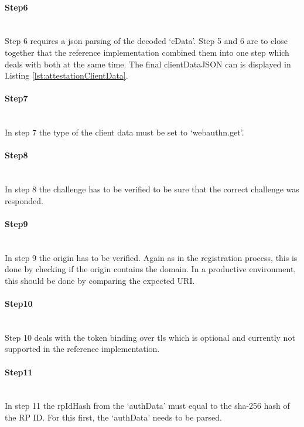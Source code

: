 \documentclass[a4paper, 11pt]{scrartcl}
\begin{document}
\paragraph{Step6}\hfill \\ 
Step 6 requires a \gls{json} parsing of the decoded `cData'. Step 5 and 6 are to close together that the reference implementation combined them into one step which deals with both at the same time. The final clientDataJSON can is displayed in Listing \ref{lst:attestationClientData}.



\paragraph{Step7}\hfill \\ 
In step 7 the type of the client data must be set to `webauthn.get'.

\paragraph{Step8}\hfill \\ 
In step 8 the challenge has to be verified to be sure that the correct challenge was responded.

\paragraph{Step9}\hfill \\ 
In step 9 the origin has to be verified. Again as in the registration process, this is done by checking if the origin contains the domain. In a productive environment, this should be done by comparing the expected URI.

\paragraph{Step10}\hfill \\ 
Step 10 deals with the token binding over \gls{tls} which is optional and currently not supported in the reference implementation.

\paragraph{Step11}\hfill \\ 
In step 11 the rpIdHash from the `authData' must equal to the \gls{sha-256} hash of the RP ID. For this first, the `authData' needs to be parsed. 
\end{document}
